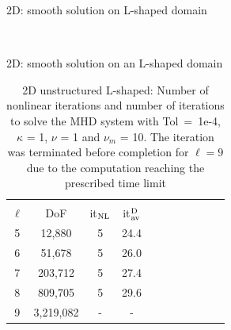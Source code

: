 \documentclass[12pt]{beamer}
\begin{document}
\begin{frame}{2D: smooth solution on L-shaped domain}

\begin{figure}
    \centering

   \\
\end{figure}
\end{frame}

\begin{frame}{2D: smooth solution on an L-shaped domain}
\begin{table}
\centering
\begin{tabular}{ccccccccccc}
\hline
\hline\\[-0.35cm]
  $\ell$ & DoF &  it$_{\rm NL}$ &  it$_{\rm av}^{\rm D}$ \\[0.05cm]
\hline
\hline
 5 &   12,880 & 5 & 24.4 \\
 6 &   51,678 & 5  & 26.0 \\
 7 &  203,712 & 5  & 27.4 \\
 8 &  809,705 & 5  & 29.6 \\
9 &  3,219,082 & -  & - \\
\hline\hline
\end{tabular}
\caption{2D unstructured L-shaped: Number of nonlinear iterations and number of iterations to solve the MHD system with Tol~=~1e-4, $\kappa$ = 1, $\nu$ = 1 and $\nu_m$ = 10. The iteration was terminated before completion for $\ell=9$ due to the computation reaching the prescribed time limit}
\label{tab:2DsmoothLshape}
\end{table}

\end{frame}
\end{document}
